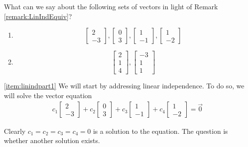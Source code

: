 \documentclass{ximera}
\begin{document}
\begin{example}\label{ex:linind}What can we say about the following sets of vectors in light of Remark \ref{remark:LinIndEquiv}?

\begin{enumerate}
\item \label{item:linindpart1}
$$\begin{bmatrix}2\\-3\end{bmatrix}, \begin{bmatrix}0\\3\end{bmatrix},\begin{bmatrix}1\\-1\end{bmatrix},\begin{bmatrix}1\\-2\end{bmatrix}$$

\item \label{item:linindpart2} $$\begin{bmatrix}2\\1\\4\end{bmatrix},\begin{bmatrix}-3\\1\\1\end{bmatrix}$$
\end{enumerate}
\begin{explanation} \ref{item:linindpart1}
We will start by addressing linear independence.  To do so, we will solve the vector equation
\begin{align}\label{eq:linrelationpart1}c_1\begin{bmatrix}2\\-3\end{bmatrix}+c_2 \begin{bmatrix}0\\3\end{bmatrix}+c_3\begin{bmatrix}1\\-1\end{bmatrix}+c_4\begin{bmatrix}1\\-2\end{bmatrix}=\vec{0}\end{align}
 
 Clearly $c_1=c_2=c_3=c_4=0$ is a solution to the equation.  The question is whether another solution exists.
 

\end{explanation}
\end{example}
\end{document}
